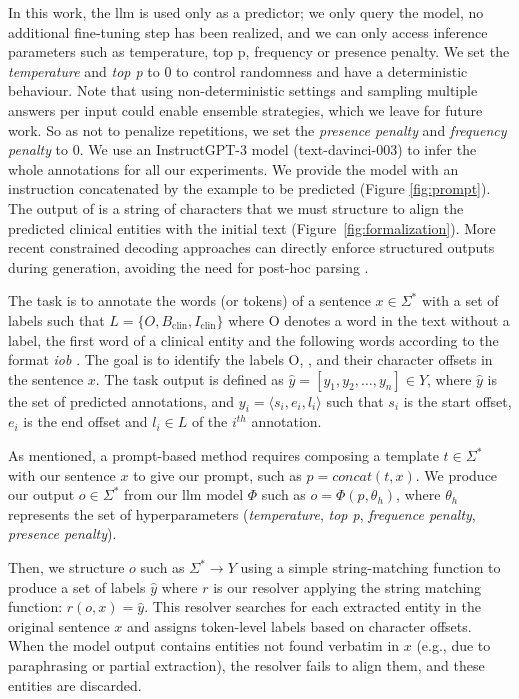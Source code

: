 In this work, the \gls{llm} is used only as a predictor; we only query the model, no additional fine-tuning step has been realized, and we can only access inference parameters such as temperature, top p, frequency or presence penalty. We set the \textit{temperature} and \textit{top p} to 0 to control randomness and have a deterministic behaviour.
Note that using non-deterministic settings and sampling multiple answers per input could enable ensemble strategies, which we leave for future work.
So as not to penalize repetitions, we set the \textit{presence penalty} and \textit{frequency penalty} to 0. We use an InstructGPT-3 model (text-davinci-003) \citep{ouyang2022training} to infer the whole annotations for all our experiments.
We provide the model with an instruction concatenated by the example to be predicted (Figure \ref{fig:prompt}). The output of \instruct is a string of characters that we must structure to align the predicted clinical entities with the initial text (Figure~\ref{fig:formalization}).
More recent constrained decoding approaches can directly enforce structured outputs during generation, avoiding the need for post-hoc parsing \citep{geng2023grammar}.

 The task is to annotate the words (or tokens) of a sentence $x \in \Sigma^*$ with a set of labels such that $L=\{O, B_\text{clin}, I_{\text{clin}}\}$ where O denotes a word in the text without a label, \bclin the first word of a clinical entity and \iclin the following words according to the format \textit{\gls{iob}} \citep{Ramshaw1995TextLearning}. The goal is to identify the labels O, \bclin, \iclin and their character offsets in the sentence $x$. The task output is defined as $\hat{y}=[ y_1, y_2, \ldots, y_n ] \in Y$, where $\hat{y}$ is the set of predicted annotations, and $y_i= \langle s_i, e_i, l_i
\rangle$ such that $s_i$ is the start offset, $e_i$ is the end offset and $l_i\in L$ of the $i^{th}$ annotation.


As mentioned, a prompt-based method requires composing a template $t \in \Sigma^*$ with our sentence $x$ to give our prompt, such as $p=concat(t,x)$. 
We produce our output $o \in \Sigma^*$ from our \gls{llm} model $\Phi$ such as $o=\Phi(p, \theta_h)$, where $\theta_h$ represents the set of hyperparameters (\textit{temperature}, \textit{top p}, \textit{frequence penalty}, \textit{presence penalty}).

Then, we structure $o$ such as $\Sigma^* \rightarrow Y$ using a simple string-matching function to produce a set of labels $\hat{y}$ where $r$ is our resolver applying the string matching function: $r(o, x)=\hat{y}$.
This resolver searches for each extracted entity in the original sentence $x$ and assigns token-level labels based on character offsets.
When the model output contains entities not found verbatim in $x$ (e.g., due to paraphrasing or partial extraction), the resolver fails to align them, and these entities are discarded.

